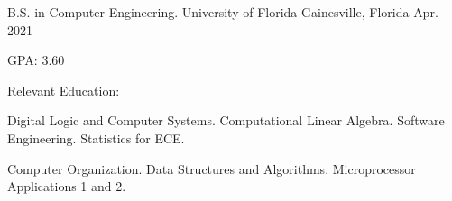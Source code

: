 


\begin{cventries}


\cventry
{B.S. in Computer Engineering.} %
{University of Florida} %
{Gainesville, Florida} %
{Apr. 2021} %
{ %
\begin{cvitems}
\item {GPA: 3.60}
\item Relevant Education:
\setlength{\itemindent}{.125in}
\item {Digital Logic and Computer Systems. Computational Linear Algebra. Software Engineering. Statistics for ECE.}
\item {Computer Organization. Data Structures and Algorithms. Microprocessor Applications 1 and 2.}
\end{cvitems}
}


\end{cventries}
